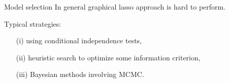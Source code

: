 \documentclass[11pt,handout,aspectratio=169,dvipsnames]{beamer}
\begin{document}
\begin{frame}{Model selection}
In general graphical lasso approach is hard to perform. \\

\bigskip
Typical strategies:
\begin{enumerate}
	\item [(i)] using conditional independence tests,
	\item [(ii)] heuristic search to optimize some information criterion,
	\item [(iii)] Bayesian methods involving MCMC.
\end{enumerate}
\end{frame}
\end{document}

